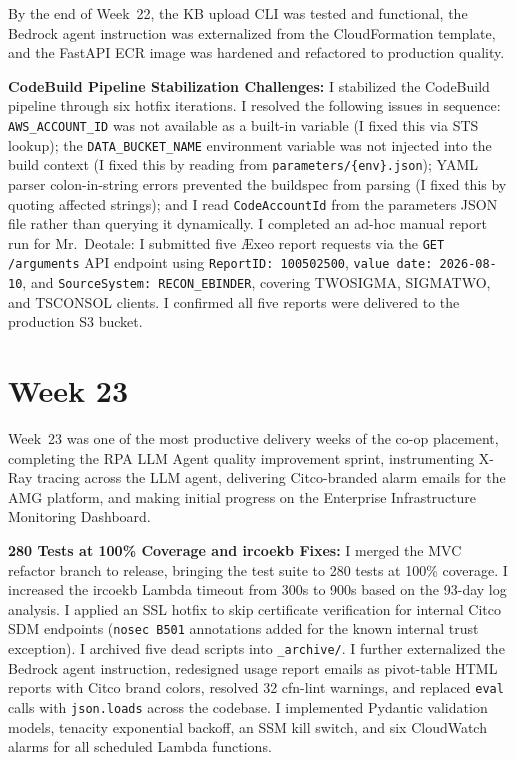 By the end of Week~22, the KB upload CLI was tested and functional,
the Bedrock agent instruction was externalized from the CloudFormation template, and
the FastAPI ECR image was hardened and refactored to production quality.

\textbf{CodeBuild Pipeline Stabilization Challenges:} 
I stabilized the CodeBuild
pipeline through six hotfix iterations.
I resolved the following issues in sequence: \texttt{AWS\_ACCOUNT\_ID} was not
available as a built-in variable (I fixed this via STS lookup); the
\texttt{DATA\_BUCKET\_NAME} environment variable was not injected into
the build context (I fixed this by reading from \texttt{parameters/\{env\}.json});
YAML parser colon-in-string errors prevented the buildspec from parsing
(I fixed this by quoting affected strings); and I read
\texttt{CodeAccountId} from the parameters JSON file rather than
querying it dynamically. I completed an ad-hoc manual report run for Mr.\ Deotale: I submitted five \AE xeo report requests
via the \texttt{GET /arguments} API endpoint using
\texttt{ReportID:~100502500}, \texttt{value date:~2026-08-10}, and
\texttt{SourceSystem:~RECON\_EBINDER}, covering TWOSIGMA, SIGMATWO,
and TSCONSOL clients. I confirmed all five reports were delivered to
the production S3 bucket.


\FloatBarrier

\section{Week 23}
\label{sec:week23}

Week~23 was one of the most productive delivery weeks of the co-op placement,
completing the RPA LLM Agent quality improvement sprint, instrumenting X-Ray tracing across
the LLM agent, delivering Citco-branded alarm emails for the AMG platform,
and making initial progress on the Enterprise Infrastructure Monitoring Dashboard.

\textbf{280 Tests at 100\% Coverage and ircoekb Fixes:} 
I merged the MVC refactor branch to release, bringing
the test suite to 280 tests at 100\% coverage. I increased the ircoekb Lambda
timeout from 300s to 900s based on the 93-day log analysis.
I applied an SSL hotfix to skip certificate verification for internal Citco
SDM endpoints (\texttt{nosec B501} annotations added for the known internal
trust exception). I archived five dead scripts into \texttt{\_archive/}.
I further externalized the Bedrock agent instruction, redesigned usage
report emails as pivot-table HTML reports with
Citco brand colors, resolved 32 cfn-lint warnings,
and replaced \texttt{eval} calls with \texttt{json.loads}
across the codebase. I implemented Pydantic validation models, tenacity
exponential backoff, an SSM kill switch, and six CloudWatch alarms for all
scheduled Lambda functions.

